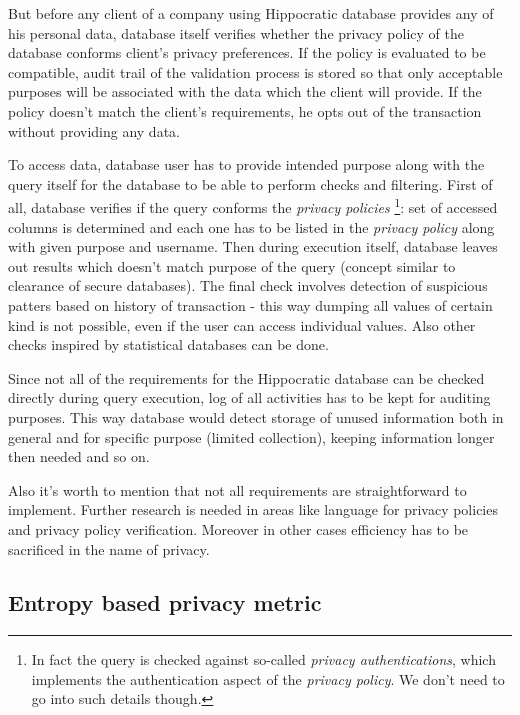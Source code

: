 \documentclass[a4paper]{article}
\begin{document}
But before any client of a company using Hippocratic database provides any of
his personal data, database itself verifies whether the privacy policy of the
database conforms client's privacy preferences.
If the policy is evaluated to be compatible, audit trail of the
validation process is stored so that only acceptable purposes will be
associated with the data which the client will provide.
If the policy doesn't match the client's requirements, he opts out of the
transaction without providing any data.

To access data, database user has to provide intended purpose along with the
query itself for the database to be able to perform checks and filtering.
First of all, database verifies if the query conforms the \emph{privacy
policies}
\footnote{
In fact the query is checked against so-called \emph{privacy
authentications}, which implements the authentication aspect of the
\emph{privacy policy}. We don't need to go into such details though.
}: set of accessed columns is determined and each one has to be listed in  the
\emph{privacy policy} along with given purpose and username.
Then during execution itself, database leaves out results which doesn't match
purpose of the query (concept similar to clearance of secure databases).
The final check involves detection of suspicious patters based on history of
transaction - this way dumping all values of certain kind is not possible, even
if the user can access individual values. Also other checks inspired by
statistical databases can be done.

Since not all of the requirements for the Hippocratic database can be
checked directly during query execution, log of all activities has to be kept
for auditing purposes. This way database would detect storage of unused
information both in general and for specific purpose (limited collection),
keeping information longer then needed and so on.

Also it's worth to mention that not all requirements are straightforward to
implement. Further research is needed in areas like language for privacy
policies and privacy policy verification. Moreover in other cases efficiency
has to be sacrificed in the name of privacy.

\subsection{Entropy based privacy metric}
\end{document}
